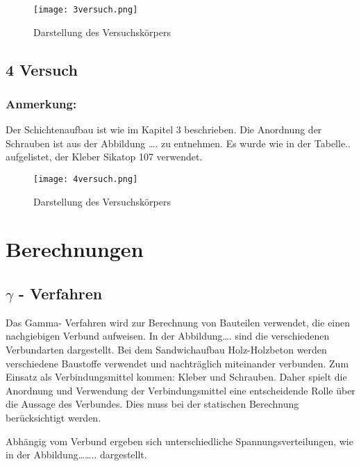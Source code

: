 \documentclass[12 pt,a4 paper ]{scrreprt}
\begin{document}
\begin{figure}
\begin{center}
\texttt{[image: 3versuch.png]}
\caption{Darstellung des Versuchskörpers}
\label{3versuch}
\end{center}
\end{figure}

\clearpage{}



\section{4 Versuch}

\subsection{Anmerkung:}
Der Schichtenaufbau ist wie im Kapitel 3 beschrieben. Die Anordnung der Schrauben ist aus der Abbildung …. zu entnehmen. Es wurde wie in der Tabelle..  aufgelistet, der Kleber Sikatop 107 verwendet. 

\begin{figure}[h]
\begin{center}
\texttt{[image: 4versuch.png]}
\caption{Darstellung des Versuchskörpers}
\label{4versuch}
\end{center}
\end{figure}

\clearpage{}

\chapter{Berechnungen}

\section{$\gamma$ - Verfahren}

Das Gamma- Verfahren wird zur Berechnung von Bauteilen verwendet, die einen nachgiebigen Verbund aufweisen. In der Abbildung…. sind die verschiedenen Verbundarten dargestellt.
Bei dem Sandwichaufbau Holz-Holzbeton werden verschiedene Baustoffe verwendet und  nachträglich miteinander verbunden. Zum Einsatz als Verbindungsmittel kommen: Kleber und Schrauben. Daher spielt die Anordnung und Verwendung der  Verbindungsmittel eine entscheidende Rolle über die Aussage des Verbundes.  Dies muss bei der statischen Berechnung berücksichtigt werden. 


Abhängig vom Verbund ergeben sich unterschiedliche Spannungsverteilungen, wie in der Abbildung…….. dargestellt.
\end{document}
